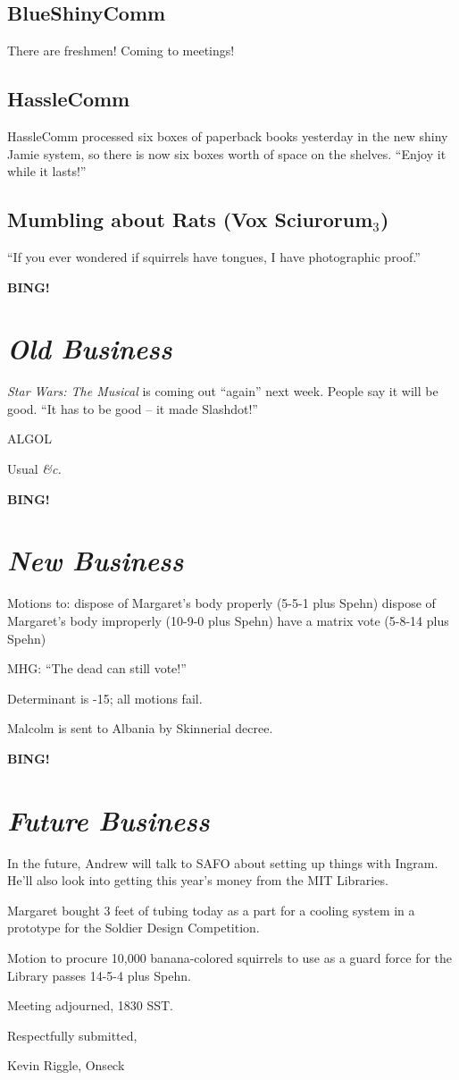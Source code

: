 \documentclass[10pt]{article}
\newcommand{\bing}{{\bf BING!} }
\newcommand{\goto}[1]{\bing \vskip 12pt \section*{{\em{#1}}}}
\newcommand{\ps}{ plus Spehn\xspace}
\begin{document}
\subsection*{BlueShinyComm}
There are freshmen!  Coming to meetings!

\subsection*{HassleComm}
HassleComm processed six boxes of paperback books yesterday in the new shiny Jamie system, so 
there is now six boxes worth of space on the shelves.  ``Enjoy it while it lasts!''

\subsection*{Mumbling about Rats (Vox Sciurorum$_3$)}
``If you ever wondered if squirrels have tongues, I have photographic proof.''

\goto{Old Business}
\emph{Star Wars: The Musical} is coming out ``again'' next week.  People say it will be good.
``It has to be good -- it made Slashdot!''

ALGOL

Usual \emph{&c.}

\goto{New Business}
Motions to: dispose of Margaret's body properly (5-5-1\ps)
dispose of Margaret's body improperly (10-9-0\ps)
have a matrix vote (5-8-14\ps)

MHG: ``The dead can still vote!''

Determinant is -15; all motions fail.

Malcolm is sent to Albania by Skinnerial decree.

\goto{Future Business}
In the future, Andrew will talk to SAFO about setting up things with Ingram.  He'll also look into
getting this year's money from the MIT Libraries.

Margaret bought 3 feet of tubing today as a part for a cooling system in a prototype for the
Soldier Design Competition.

Motion to procure 10,000 banana-colored squirrels to use as a guard force for the Library passes
14-5-4\ps.

\vspace{12pt}

\noindent
Meeting adjourned, 1830 SST.

\vspace{18pt}

\centerline{Respectfully submitted,}
\centerline{Kevin Riggle, Onseck}
\end{document}
